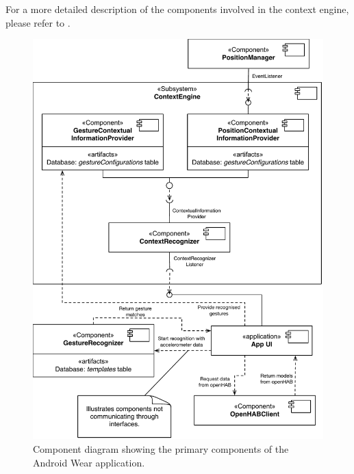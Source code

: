 For a more detailed description of the components involved in the context engine, please refer to .

\begin{figure}[h!]
\centering
\includegraphics[width=\textwidth]{images/component-diagram-wear}
\caption{Component diagram showing the primary components of the Android Wear application.}
\label{fig:implementation:component-diagram:wear}
\end{figure}

